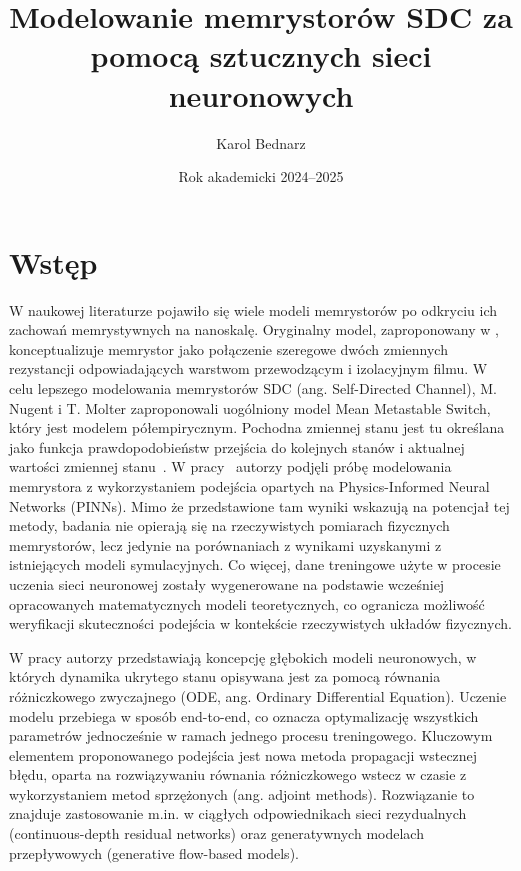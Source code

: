 \documentclass[11pt, oneside]{article}
\title{Modelowanie memrystorów SDC za pomocą sztucznych sieci neuronowych}
\author{Karol Bednarz}
\date{Rok akademicki 2024--2025}
\begin{document}
\maketitle
\tableofcontents

\vspace{.25in}

\newcommand{\Todo}[1]{\textcolor{red}{\textbf{TODO:} #1}}

\section{Wstęp}


W naukowej literaturze pojawiło się wiele modeli memrystorów po odkryciu ich zachowań memrystywnych na nanoskalę. Oryginalny model, zaproponowany w \cite{Strukov2008}, konceptualizuje memrystor jako połączenie szeregowe dwóch zmiennych rezystancji odpowiadających warstwom przewodzącym i izolacyjnym filmu. W celu lepszego modelowania memrystorów SDC (ang. Self-Directed Channel), M. Nugent i T. Molter zaproponowali uogólniony model Mean Metastable Switch, który jest modelem półempirycznym. Pochodna zmiennej stanu jest tu określana jako funkcja prawdopodobieństw przejścia do kolejnych stanów i aktualnej wartości zmiennej stanu~\cite{Molter2016}. W pracy~\cite{Lee2024} autorzy podjęli próbę modelowania memrystora z wykorzystaniem podejścia opartych na Physics-Informed Neural Networks (PINNs). Mimo że przedstawione tam wyniki wskazują na potencjał tej metody, badania nie opierają się na rzeczywistych pomiarach fizycznych memrystorów, lecz jedynie na porównaniach z wynikami uzyskanymi z istniejących modeli symulacyjnych. Co więcej, dane treningowe użyte w procesie uczenia sieci neuronowej zostały wygenerowane na podstawie wcześniej opracowanych matematycznych modeli teoretycznych, co ogranicza możliwość weryfikacji skuteczności podejścia w kontekście rzeczywistych układów fizycznych.

W pracy \cite{Ricky2018} autorzy przedstawiają koncepcję głębokich modeli neuronowych, w których dynamika ukrytego stanu opisywana jest za pomocą równania różniczkowego zwyczajnego (ODE, ang. Ordinary Differential Equation). Uczenie modelu przebiega w sposób end-to-end, co oznacza optymalizację wszystkich parametrów jednocześnie w ramach jednego procesu treningowego. Kluczowym elementem proponowanego podejścia jest nowa metoda propagacji wstecznej błędu, oparta na rozwiązywaniu równania różniczkowego wstecz w czasie z wykorzystaniem metod sprzężonych (ang. adjoint methods). Rozwiązanie to znajduje zastosowanie m.in. w ciągłych odpowiednikach sieci rezydualnych (continuous-depth residual networks) oraz generatywnych modelach przepływowych (generative flow-based models).
\end{document}
